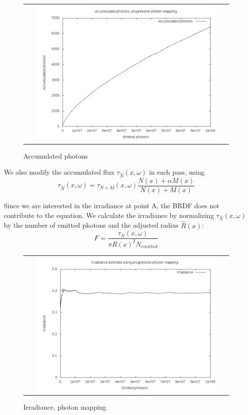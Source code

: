 \documentclass{article} %
\begin{document}
\begin{figure}[h]
\begin{tabular}{c}
\includegraphics[width=0.9\textwidth]{plots/irrad_photonmap_photons.png}\\
\end{tabular}
\caption{Accumulated photons}
\label{fig:pm_acc}
\end{figure}

We also modify the accumulated flux $\tau_{\hat{N}}(x, \omega)$ in each pass, using
$$\tau_{\hat{N}}(x, \omega) = \tau_{N+M}(x, \omega)\frac{N(x) + \alpha M(x)}{N(x) + M(x)}$$

Since we are interested in the irradiance at point A, the BRDF does not contribute to the equation. We calculate the irradiance by normalizing $\tau_{\hat{N}}(x, \omega)$ by the number of emitted photons and the adjusted radius $\hat{R}(x)$:
$$F = \frac{\tau_{N}(x, \omega)}{\pi R(x)^2 N_{emitted}}$$

\begin{figure}[H]
\begin{tabular}{c}
\includegraphics[width=0.9\textwidth]{plots/irrad_photonmap.png}\\
\end{tabular}
\caption{Irradiance, photon mapping}
\label{fig:pm_irradiance}
\end{figure}
\end{document}
